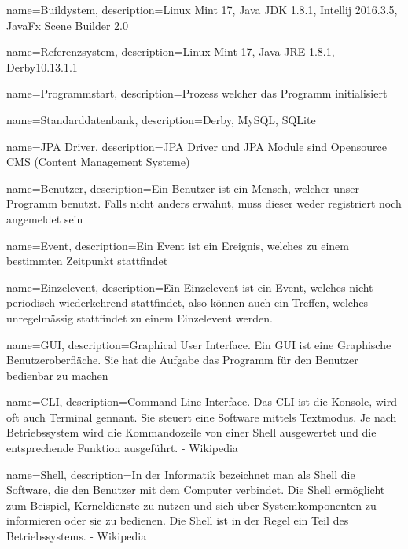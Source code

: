 
{
  name=Buildystem,
  description={Linux Mint 17, Java JDK 1.8.1, Intellij 2016.3.5, JavaFx Scene Builder 2.0}
} 

{
  name=Referenzsystem,
  description={Linux Mint 17, Java JRE 1.8.1, Derby10.13.1.1}
} 

{
  name=Programmstart,
  description={Prozess welcher das Programm initialisiert}
} 


 
{
  name=Standarddatenbank,
  description={Derby, MySQL, SQLite}
} 


{
  name=JPA Driver,
  description={JPA Driver und JPA Module sind Opensource CMS (Content Management Systeme)}
} 

{
  name=Benutzer,
  description={Ein Benutzer ist ein Mensch, welcher unser Programm benutzt. Falls nicht anders erwähnt, muss dieser
  weder registriert noch angemeldet sein}
} 


{
  name=Event,
  description={Ein Event ist ein Ereignis, welches zu einem bestimmten Zeitpunkt stattfindet}
} 

{
  name=Einzelevent,
  description={Ein Einzelevent ist ein Event, welches nicht periodisch wiederkehrend stattfindet, also können auch
   ein Treffen, welches unregelmässig stattfindet zu einem Einzelevent werden.}
} 

{
  name=GUI,
  description={Graphical User Interface. Ein GUI ist eine Graphische Benutzeroberfläche. Sie hat die Aufgabe das
  Programm für den Benutzer bedienbar zu machen}
} 

{
  name=CLI,
  description={Command Line Interface. Das CLI ist die Konsole, wird oft auch Terminal gennant. Sie steuert eine
  Software mittels Textmodus. Je nach Betriebssystem wird die Kommandozeile von einer Shell ausgewertet und die
  entsprechende Funktion ausgeführt.
  - Wikipedia}
}

{
  name=Shell,
  description={In der Informatik bezeichnet man als Shell die Software, die den Benutzer mit dem Computer verbindet.
  Die Shell ermöglicht zum Beispiel, Kerneldienste zu nutzen und sich über Systemkomponenten zu informieren oder sie zu
  bedienen. Die Shell ist in der Regel ein Teil des Betriebssystems.
  - Wikipedia
  }
}


